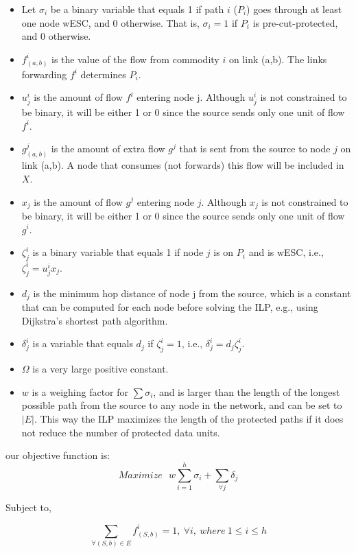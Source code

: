 \documentclass[conference]{IEEEtran}
\begin{document}
\begin{itemize}
\item Let $\sigma_i$ be a binary variable that equals 1 if path $i$ ($P_i$) goes through at least one node wESC, and 0 otherwise. That is, $\sigma_i = 1$ if $P_i$ is pre-cut-protected, and $0$ otherwise.
\item $f^i_{(a,b)}$ is the value of the flow from commodity $i$ on link (a,b). The links forwarding $f^i$ determines $P_i$.
\item $u^i_j$ is the amount of flow $f^i$ entering node j. Although $u^i_j$ is not constrained to be binary, it will be either 1 or 0 since the source sends only one unit of flow $f^i$.
\item $g^j_{(a,b)}$ is the amount of extra flow $g^j$ that is sent from the source to node $j$ on link (a,b). A node that consumes (not forwards) this flow will be included in $X$. 
\item $x_j$ is the amount of flow $g^j$ entering node $j$. Although $x_j$ is not constrained to be binary, it will be either 1 or 0 since the source sends only one unit of flow $g^i$.
\item $\zeta^i_j$ is a binary variable that equals 1 if node $j$ is on $P_i$ and is wESC, i.e., $\zeta^i_j = u^i_jx_j$.
\item $d_j$ is the minimum hop distance of node j from the source, which is a constant that can be computed for each node before solving the ILP, e.g., using Dijkstra's shortest path algorithm. 
\item $\delta^i_j$ is a variable that equals $d_j$ if $\zeta^i_j = 1$, i.e., $\delta^i_j = d_j \zeta^i_j$.
\item $\Omega$ is a very large positive constant. 
\item $w$ is a weighing factor for $\sum \sigma_i$, and is larger than the length of the longest possible path from the source to any node in the network, and can be set to $|E|$. This way the ILP maximizes the length of the protected paths if it does not reduce the number of protected data units.
\end{itemize}

our objective function is:
\begin{equation}
\label{obj}
Maximize ~~~ w\sum^h_{i=1} \sigma_i + \sum_{\forall j}\delta_j
\end{equation}

Subject to,

\begin{equation}
\label{FlowIsH}
{\sum_{\forall(S,b) \in E} f^i_{(S,b)} = 1,~\forall i, ~ where~ 1\leq i \leq h}
\end{equation}
\end{document}
